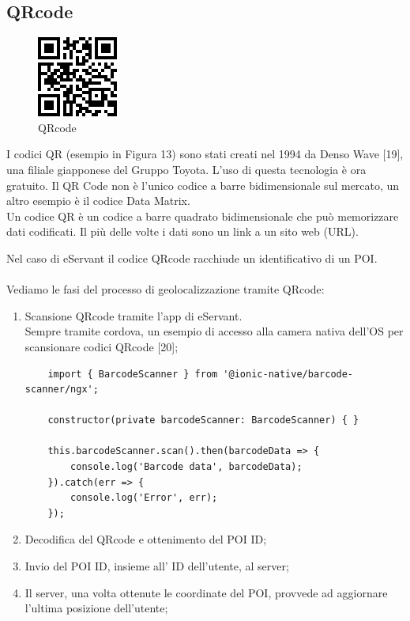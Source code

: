 \subsection{QRcode}
\begin{figure}[H]
    \centering  
    \caption{QRcode}
    \includegraphics[scale=1]{img/cap2/barcode-qrcode}
\end{figure}
I codici QR (esempio in Figura 13) sono stati creati nel 1994 da Denso Wave [19], una filiale giapponese del Gruppo Toyota.
L'uso di questa tecnologia è ora gratuito. Il QR Code non è l'unico codice a barre bidimensionale 
sul mercato, un altro esempio è il codice Data Matrix.
\\
Un codice QR è un codice a barre quadrato bidimensionale che può memorizzare dati codificati. 
Il più delle volte i dati sono un link a un sito web (URL).

Nel caso di eServant il codice QRcode racchiude un identificativo di un POI. \\ \\
Vediamo le fasi del processo di geolocalizzazione tramite QRcode:

\begin{enumerate}
    \item Scansione QRcode tramite l'app di eServant.\\
    Sempre tramite cordova, un esempio di accesso alla camera nativa dell'OS per scansionare
    codici QRcode [20];
\begin{lstlisting}
    import { BarcodeScanner } from '@ionic-native/barcode-scanner/ngx';
    
    constructor(private barcodeScanner: BarcodeScanner) { }
    
    this.barcodeScanner.scan().then(barcodeData => {
        console.log('Barcode data', barcodeData);
    }).catch(err => {
        console.log('Error', err);
    });
\end{lstlisting}

    \item Decodifica del QRcode e ottenimento del POI ID;
    \item Invio del POI ID, insieme all' ID dell'utente, al server;
    \item Il server, una volta ottenute le coordinate del POI, provvede ad aggiornare l'ultima posizione dell'utente;
\end{enumerate}


